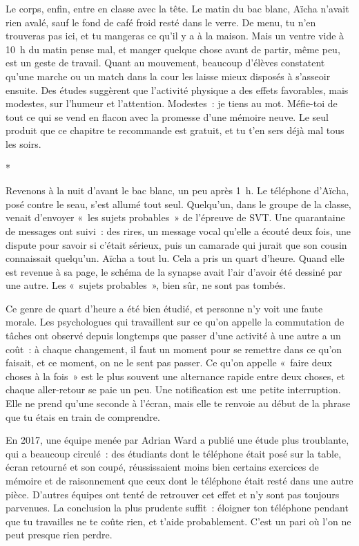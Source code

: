 \documentclass[10.5pt,twoside,openright]{book}
\newcommand{\asterisme}{\par\vspace{0.7em}\centerline{\color{gris}*\quad*\quad*}\vspace{0.7em}\par\noindent}
\begin{document}
Le corps, enfin, entre en classe avec la tête. Le matin du bac blanc, Aïcha n’avait rien avalé, sauf le fond de café froid resté dans le verre. De menu, tu n’en trouveras pas ici, et tu mangeras ce qu’il y a à la maison. Mais un ventre vide à 10 h du matin pense mal, et manger quelque chose avant de partir, même peu, est un geste de travail. Quant au mouvement, beaucoup d’élèves constatent qu’une marche ou un match dans la cour les laisse mieux disposés à s’asseoir ensuite. Des études suggèrent que l’activité physique a des effets favorables, mais modestes, sur l’humeur et l’attention. Modestes : je tiens au mot. Méfie-toi de tout ce qui se vend en flacon avec la promesse d’une mémoire neuve. Le seul produit que ce chapitre te recommande est gratuit, et tu t’en sers déjà mal tous les soirs.

\asterisme

Revenons à la nuit d’avant le bac blanc, un peu après 1 h. Le téléphone d’Aïcha, posé contre le seau, s’est allumé tout seul. Quelqu’un, dans le groupe de la classe, venait d’envoyer « les sujets probables » de l’épreuve de SVT. Une quarantaine de messages ont suivi : des rires, un message vocal qu’elle a écouté deux fois, une dispute pour savoir si c’était sérieux, puis un camarade qui jurait que son cousin connaissait quelqu’un. Aïcha a tout lu. Cela a pris un quart d’heure. Quand elle est revenue à sa page, le schéma de la synapse avait l’air d’avoir été dessiné par une autre. Les « sujets probables », bien sûr, ne sont pas tombés.

Ce genre de quart d’heure a été bien étudié, et personne n’y voit une faute morale. Les psychologues qui travaillent sur ce qu’on appelle la commutation de tâches ont observé depuis longtemps que passer d’une activité à une autre a un coût : à chaque changement, il faut un moment pour se remettre dans ce qu’on faisait, et ce moment, on ne le sent pas passer. Ce qu’on appelle « faire deux choses à la fois » est le plus souvent une alternance rapide entre deux choses, et chaque aller-retour se paie un peu. Une notification est une petite interruption. Elle ne prend qu’une seconde à l’écran, mais elle te renvoie au début de la phrase que tu étais en train de comprendre.

En 2017, une équipe menée par Adrian Ward a publié une étude plus troublante, qui a beaucoup circulé : des étudiants dont le téléphone était posé sur la table, écran retourné et son coupé, réussissaient moins bien certains exercices de mémoire et de raisonnement que ceux dont le téléphone était resté dans une autre pièce. D’autres équipes ont tenté de retrouver cet effet et n’y sont pas toujours parvenues. La conclusion la plus prudente suffit : éloigner ton téléphone pendant que tu travailles ne te coûte rien, et t’aide probablement. C’est un pari où l’on ne peut presque rien perdre.
\end{document}
